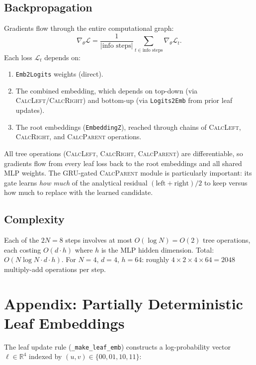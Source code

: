 \documentclass[11pt,a4paper]{article}
\newcommand{\R}{\mathbb{R}}
\newcommand{\calL}{\textsc{CalcLeft}}
\newcommand{\calR}{\textsc{CalcRight}}
\newcommand{\calP}{\textsc{CalcParent}}
\begin{document}
\subsection{Backpropagation}

Gradients flow through the entire computational graph:
\[
\nabla_\theta \mathcal{L} = \frac{1}{|\text{info steps}|} \sum_{t \in \text{info steps}} \nabla_\theta \mathcal{L}_t.
\]
Each loss $\mathcal{L}_t$ depends on:
\begin{enumerate}[nosep]
\item \texttt{Emb2Logits} weights (direct).
\item The combined embedding, which depends on top-down (via \calL/\calR) and bottom-up (via \texttt{Logits2Emb} from prior leaf updates).
\item The root embeddings (\texttt{EmbeddingZ}), reached through chains of \calL, \calR, and \calP{} operations.
\end{enumerate}
All tree operations (\calL, \calR, \calP) are differentiable, so gradients flow from every leaf loss back to the root embeddings and all shared MLP weights.  The GRU-gated \calP{} module is particularly important: its gate learns \emph{how much} of the analytical residual $(\text{left}+\text{right})/2$ to keep versus how much to replace with the learned candidate.

\subsection{Complexity}

Each of the $2N = 8$ steps involves at most $O(\log N) = O(2)$ tree operations, each costing $O(d \cdot h)$ where $h$ is the MLP hidden dimension.  Total: $O(N \log N \cdot d \cdot h)$.  For $N=4$, $d=4$, $h=64$: roughly $4 \times 2 \times 4 \times 64 = 2048$ multiply-add operations per step.

\section{Appendix: Partially Deterministic Leaf Embeddings}
\label{sec:leaf_emb}

The leaf update rule (\texttt{\_make\_leaf\_emb}) constructs a log-probability vector $\ell \in \R^4$ indexed by $(u,v) \in \{00, 01, 10, 11\}$:
\end{document}
